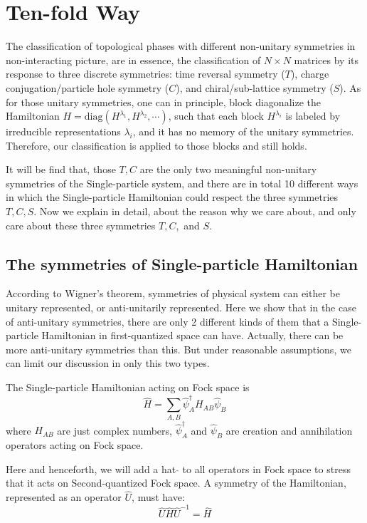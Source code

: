 \documentclass{article}
\begin{document}
\section{Ten-fold Way}

The classification of topological phases with different non-unitary symmetries
in non-interacting picture, are in essence, the classification of $N\times N$
matrices by its response to three discrete symmetries: time reversal symmetry
($T$), charge conjugation/particle hole symmetry ($C$), and chiral/sub-lattice
symmetry ($S$). As for those unitary symmetries, one can in principle, block
diagonalize the Hamiltonian
$H=\mathrm{diag}(H^{\lambda_1},H^{\lambda_2},\cdots)$, such that each block
$H^{\lambda_i}$ is labeled by irreducible representations $\lambda_i$, and it
has no memory of the unitary symmetries. Therefore, our classification is
applied to those blocks and still holds.

It will be find that, those $T,C$ are the only two meaningful non-unitary
symmetries of the Single-particle system, and there are in total 10 different
ways in which the Single-particle Hamiltonian could respect the three symmetries
$T,C,S$. Now we explain in detail, about the reason why we care about, and only
care about these three symmetries $T,C,$ and $S$.

\subsection{The symmetries of Single-particle Hamiltonian}
\label{sec:The symmetries of Single-particle Hamiltonian}

According to Wigner's theorem, symmetries of physical system can either be
unitary represented, or anti-unitarily represented. Here we show that in the
case of anti-unitary symmetries, there are only 2 different kinds of them that a
Single-particle Hamiltonian in first-quantized space can have. Actually, there
can be more anti-unitary symmetries than this. But under reasonable assumptions,
we can limit our discussion in only this two types.

The Single-particle Hamiltonian acting on Fock space is
\begin{equation}
    \label{eq:H-2nd}
    \hat{H} = \sum_{A,B} \hat\psi^\dagger_A H_{AB} \hat\psi_{B}
\end{equation}
where $H_{AB}$ are just complex numbers, $\hat\psi^\dagger_A$ and $\hat\psi_B$
are creation and annihilation operators acting on Fock space.

Here and henceforth, we will add a hat $\hat{}$ to all operators in Fock space
to stress that it acts on Second-quantized Fock space.  A symmetry of the
Hamiltonian, represented as an operator $\hat{U}$, must have:
\begin{equation}
    \label{eq:sym-in-2nd-1}
    \hat{U}\hat{H}\hat{U}^{-1} = \hat{H}
\end{equation}
\end{document}
